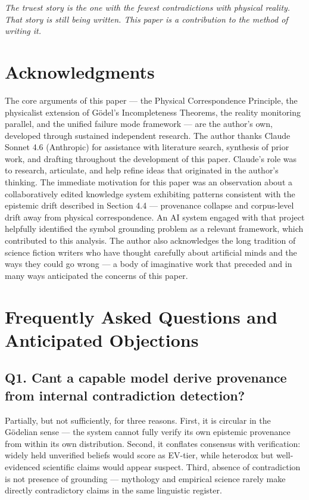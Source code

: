 \documentclass[12pt]{article}
\begin{document}
\emph{The truest story is the one with the fewest contradictions with
physical reality. That story is still being written. This paper is a
contribution to the method of writing it.}

\section*{Acknowledgments}

The core arguments of this paper --- the Physical Correspondence
Principle, the physicalist extension of Gödel's Incompleteness Theorems,
the reality monitoring parallel, and the unified failure mode framework
--- are the author's own, developed through sustained independent
research. The author thanks Claude Sonnet 4.6 (Anthropic) for assistance
with literature search, synthesis of prior work, and drafting throughout
the development of this paper. Claude's role was to research,
articulate, and help refine ideas that originated in the author's
thinking. The immediate motivation for this paper was an observation
about a collaboratively edited knowledge system exhibiting patterns
consistent with the epistemic drift described in Section 4.4 ---
provenance collapse and corpus-level drift away from physical
correspondence. An AI system engaged with that project helpfully
identified the symbol grounding problem as a relevant framework, which
contributed to this analysis. The author also acknowledges the long
tradition of science fiction writers who have thought carefully about
artificial minds and the ways they could go wrong --- a body of
imaginative work that preceded and in many ways anticipated the concerns
of this paper.

\appendix

\section{Frequently Asked Questions and Anticipated Objections}\label{appendix-a-frequently-asked-questions-and-anticipated-objections}

\subsection{Q1. Can\textquotesingle t a capable model derive provenance
from internal contradiction
detection?}\label{q1.-cant-a-capable-model-derive-provenance-from-internal-contradiction-detection}

Partially, but not sufficiently, for three reasons. First, it is
circular in the Gödelian sense --- the system cannot fully verify its
own epistemic provenance from within its own distribution. Second, it
conflates consensus with verification: widely held unverified beliefs
would score as EV-tier, while heterodox but well-evidenced scientific
claims would appear suspect. Third, absence of contradiction is not
presence of grounding --- mythology and empirical science rarely make
directly contradictory claims in the same linguistic register.
\end{document}
